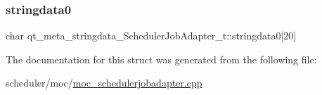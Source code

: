 \subsubsection{\texorpdfstring{stringdata0}{stringdata0}}
{\footnotesize\ttfamily char qt\+\_\+meta\+\_\+stringdata\+\_\+\+Scheduler\+Job\+Adapter\+\_\+t\+::stringdata0\mbox{[}20\mbox{]}}



The documentation for this struct was generated from the following file\+:\begin{DoxyCompactItemize}
\item 
scheduler/moc/\mbox{\hyperlink{moc__schedulerjobadapter_8cpp}{moc\+\_\+schedulerjobadapter.\+cpp}}\end{DoxyCompactItemize}
